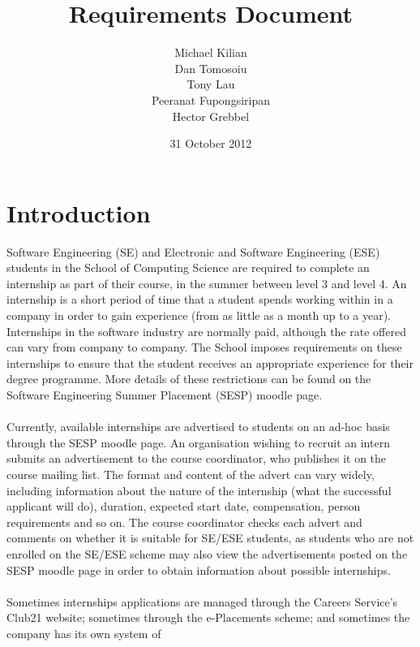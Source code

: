 \documentclass{l3deliverable}
\title{Requirements Document}
\author{Michael Kilian\\
	Dan Tomosoiu\\
	Tony Lau\\
	Peeranat Fupongsiripan\\
	Hector Grebbel
}
\date{31 October 2012}
\begin{document}

\maketitle

\tableofcontents

\newpage


\section{Introduction}
Software Engineering (SE) and Electronic and Software Engineering (ESE) students in the School
of Computing Science are required to complete an internship as part of their course, in the summer
between level 3 and level 4. An internship is a short period of time that a student spends working
within in a company in order to gain experience (from as little as a month up to a year). Internships
in the software industry are normally paid, although the rate offered can vary from company to
company. The School imposes requirements on these internships to ensure that the student receives
an appropriate experience for their degree programme. More details of these restrictions can be found
on the Software Engineering Summer Placement (SESP) moodle page.\\
\\
Currently, available internships are advertised to students on an ad-hoc basis through the SESP
moodle page. An organisation wishing to recruit an intern submits an advertisement to the course
coordinator, who publishes it on the course mailing list. The format and content of the advert can
vary widely, including information about the nature of the internship (what the successful applicant
will do), duration, expected start date, compensation, person requirements and so on. The course
coordinator checks each advert and comments on whether it is suitable for SE/ESE students, as students 
who are not enrolled on the SE/ESE scheme may also view the advertisements posted on
the SESP moodle page in order to obtain information about possible internships.\\
\\
Sometimes internships applications are managed through the Careers Service's Club21 website;
sometimes through the e-Placements scheme; and sometimes the company has its own system of
\end{document}
